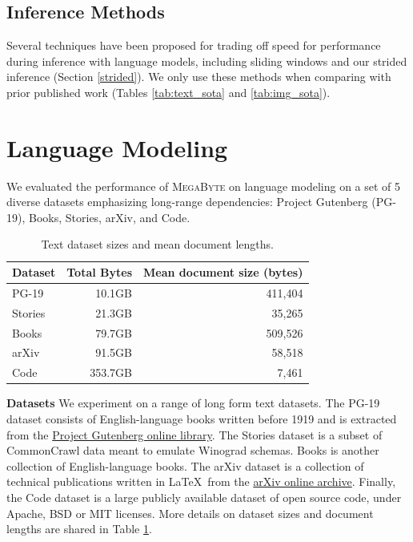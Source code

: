 \documentclass{article}
\newcommand{\fastslow}[0]{\textsc{MegaByte}\xspace}
\newcommand{\megabyte}[0]{\fastslow}
\theoremstyle{plain}
\theoremstyle{definition}
\theoremstyle{remark}
\begin{document}
\subsection{Inference Methods}
Several techniques have been proposed for trading off speed for performance during inference with language models, including sliding windows \cite{shortformer} and our strided inference (Section \ref{strided}). We only use these methods when comparing with prior published work (Tables \ref{tab:text_sota} and \ref{tab:img_sota}).




\section{Language Modeling}
We evaluated the performance of \megabyte on language modeling on a set of 5 diverse datasets emphasizing long-range dependencies: Project Gutenberg (PG-19), Books, Stories, arXiv, and Code. 
\begin{table}[t]
    \centering\small
    \begin{tabular}{lrr}
    \toprule
    Dataset & Total Bytes & Mean document size (bytes)  \\
    \midrule
    PG-19 & 10.1GB & 411,404 \\
    Stories & 21.3GB & 35,265 \\
    Books & 79.7GB & 509,526 \\
    arXiv & 91.5GB & 58,518 \\
    Code & 353.7GB & 7,461 \\
    \bottomrule
    \end{tabular}
    \caption{Text dataset sizes and mean document lengths.}
    \label{tab:document_lengths}
\end{table}





\textbf{Datasets} We experiment on a range of long form text datasets. The PG-19 dataset \cite{pg19} consists of English-language books written before 1919 and is extracted from the \href{https://www.gutenberg.org/}{Project Gutenberg online library}. The Stories dataset \cite{stories} is a subset of CommonCrawl data meant to emulate Winograd schemas. Books \cite{pile} is another collection of English-language books. The arXiv dataset is a collection of technical publications written in \LaTeX ~from the \href{arxiv.org}{arXiv online archive}. Finally, the Code dataset is a large publicly available dataset of open source code, under Apache, BSD or MIT licenses. More details on dataset sizes and document lengths are shared in Table \ref{tab:document_lengths}. 
\end{document}
